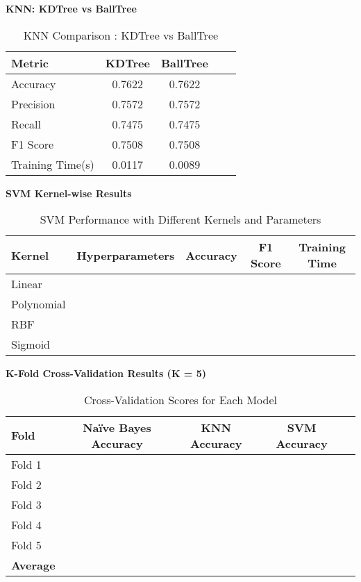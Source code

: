 \documentclass[11pt]{article}
\begin{document}
\vspace{0.5cm}
\noindent
\textbf{KNN: KDTree vs BallTree} \\
\begin{table}[h!]
\centering
\begin{tabular}{|l|c|c|c|c|}
\hline
\textbf{Metric} & \textbf{KDTree} & \textbf{BallTree}\\
\hline
Accuracy & 0.7622 & 0.7622 \\
Precision & 0.7572 & 0.7572 \\
Recall & 0.7475 & 0.7475 \\
F1 Score & 0.7508 & 0.7508 \\
Training Time(s) & 0.0117 & 0.0089 \\
\hline
\end{tabular}
\caption{KNN Comparison : KDTree vs BallTree}
\end{table}

\vspace{0.5cm}
\noindent
\textbf{SVM Kernel-wise Results} \\
\begin{table}[h!]
\centering
\begin{tabular}{|l|c|c|c|c|}
\hline
\textbf{Kernel} & \textbf{Hyperparameters} & \textbf{Accuracy} & \textbf{F1 Score} & \textbf{Training Time}\\
\hline
Linear &  &  &  &\\
Polynomial &  &  &  &\\
RBF &  &  &  &\\
Sigmoid &  &  &  &\\
\hline
\end{tabular}
\caption{SVM Performance with Different Kernels and Parameters}
\end{table}

\vspace{0.5cm}
\noindent
\textbf{K-Fold Cross-Validation Results (K = 5)} \\
\begin{table}[h!]
\centering
\begin{tabular}{|l|c|c|c|c|}
\hline
\textbf{Fold} & \textbf{Naïve Bayes Accuracy} & \textbf{KNN Accuracy} & \textbf{SVM Accuracy}\\
\hline
Fold 1 &  &  &\\
Fold 2 &  &  &\\
Fold 3 &  &  &\\
Fold 4 &  &  &\\
Fold 5 &  &  &\\
\hline
\textbf{Average} &  &  &\\
\hline
\end{tabular}
\caption{Cross-Validation Scores for Each Model}
\end{table}
\end{document}
